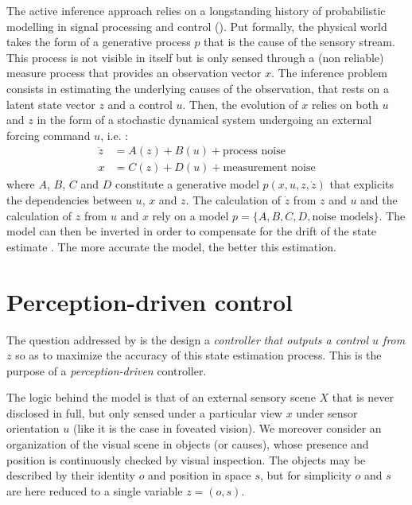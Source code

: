 \documentclass{article} %
\begin{document}
The active inference approach relies on a longstanding history of probabilistic modelling in signal processing and control (\cite{Kalman1960,Baum1966,friston1994statistical}).  Put formally, the physical world  takes the form of a generative process $p$ that is the cause of the sensory stream. This process is not visible in itself but is only sensed through a (non reliable) measure process that provides an observation vector $x$. The inference problem consists in estimating the underlying causes of the observation, that rests on a latent state vector $z$ and a control $u$.  Then, the evolution of $x$ relies on both $u$ and $z$ in the form of a stochastic dynamical system undergoing an external forcing command $u$, i.e. :
\begin{align}
\dot{z} &= A(z) + B(u) + \text{process noise}\label{eq:kalman-process}\\
x &= C(z) + D(u) + \text{measurement noise} \label{eq:kalman-measure}
\end{align}  
where $A$, $B$, $C$ and $D$ constitute a generative model $p(x,u,z,\dot{z})$ that explicits the dependencies between $u$, $x$ and $z$. %
The calculation of $\dot{z}$ from $z$ and $u$ and the calculation of $z$ from $u$ and $x$ rely on a model $p = \{A,B,C,D,\text{noise models}\}$. The model can then be inverted in order to compensate for the drift of the state estimate \cite{Kalman1960,Baum1966}. The more accurate the model, the better this estimation. 

\section{Perception-driven control}
The question addressed by \cite{friston2012perceptions} is the design a \emph{controller} \emph{that outputs a control $u$ from $z$} so as to maximize the accuracy of this state estimation process. This is the purpose of a \emph{perception-driven} controller.

The logic behind the model is that of an external sensory scene $X$ that is never disclosed in full, but only sensed under a particular view $x$ under sensor orientation $u$ (like it is the case in foveated vision). 
We moreover consider an organization of the visual scene in objects (or causes), whose presence and position is continuously checked by visual inspection. The objects may be described by their identity $o$ and position in space $s$, but for simplicity $o$ and $s$ are here reduced to a single variable $z = (o, s)$. 
\end{document}
